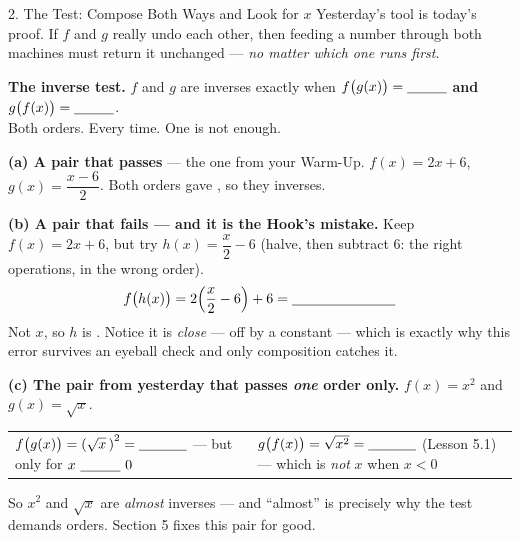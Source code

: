 \documentclass[10pt]{article}
\begin{document}
\begin{notesbox}{2. The Test: Compose Both Ways and Look for $x$}
Yesterday's tool is today's proof. If $f$ and $g$ really undo each other, then feeding a number
through both machines must return it unchanged --- \emph{no matter which one runs first}.
\begin{center}
\begin{tcolorbox}[colback=goldbg, colframe=goldacc, boxrule=0.8pt, arc=1.5mm, width=0.94\linewidth,
    left=3mm, right=3mm, top=2mm, bottom=2mm]
\centering\small
\textbf{The inverse test.} \quad $f$ and $g$ are inverses \; exactly when \;
$f\big(g(x)\big)=\blank{1.0cm}$ \; \textbf{and} \; $g\big(f(x)\big)=\blank{1.0cm}$.
\\[3pt]
Both orders. Every time. One is not enough.
\end{tcolorbox}
\end{center}
\vspace{2pt}
\textbf{(a) A pair that passes} --- the one from your Warm-Up. \quad $f(x)=2x+6$, \;
$g(x)=\dfrac{x-6}{2}$. \quad Both orders gave \blank{1.0cm}, so they \blank{2.4cm} inverses.

\vspace{5pt}
\textbf{(b) A pair that fails --- and it is the Hook's mistake.} Keep $f(x)=2x+6$, but try
$h(x)=\dfrac{x}{2}-6$ (halve, then subtract $6$: the right operations, in the wrong order).
\[
  f\big(h(x)\big)=2\!\left(\frac{x}{2}-6\right)+6=\blank{2.6cm}
\]
Not $x$, so $h$ is \blank{2.4cm}. Notice it is \emph{close} --- off by a constant --- which is
exactly why this error survives an eyeball check and only composition catches it.

\vspace{5pt}
\textbf{(c) The pair from yesterday that passes \emph{one} order only.} $f(x)=x^{2}$ and
$g(x)=\sqrt{x}$.
\begin{center}
\renewcommand{\arraystretch}{1.5}
\begin{tabularx}{0.96\linewidth}{@{}X|X@{}}
$f\big(g(x)\big)=\left(\sqrt{x}\,\right)^{2}=\blank{1.2cm}$ \; --- but only for $x\ \blank{1.0cm}\ 0$ &
$g\big(f(x)\big)=\sqrt{x^{2}}=\blank{1.2cm}$ \; (Lesson 5.1) --- which is \emph{not} $x$ when $x<0$ \\
\end{tabularx}
\end{center}
\vspace{-2pt}
So $x^{2}$ and $\sqrt{x}$ are \emph{almost} inverses --- and ``almost'' is precisely why the test
demands \blank{2.4cm} orders. Section 5 fixes this pair for good.
\end{notesbox}
\end{document}
